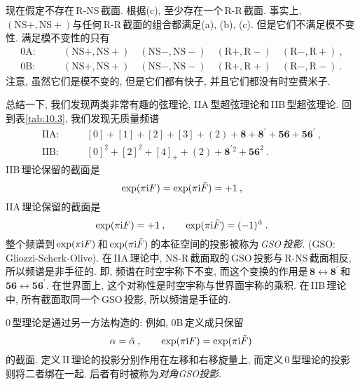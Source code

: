 现在假定不存在\,R-NS\,截面. 根据(c), 至少存在一个\,R-R\,截面. 事实上, $(\text{NS}+,\text{NS}+)$与任何\,R-R\,截面的组合都满足(a), (b), (c). 但是它们不满足模不变性. 满足模不变性的只有
\begin{align*}
     \text{0A}:&\qquad (\text{NS}+,\text{NS}+)\quad (\text{NS}-,\text{NS}-)\quad (\text{R}+,\text{R}-)\quad (\text{R}-,\text{R}+) \:, \\
    \text{0B}:& \qquad (\text{NS}+,\text{NS}+)\quad (\text{NS}-,\text{NS}-)\quad (\text{R}+,\text{R}+)\quad (\text{R}-,\text{R}-) \:.
\end{align*}
注意, 虽然它们是模不变的, 但是它们都有快子, 并且它们都没有时空费米子.

总结一下, 我们发现两类非常有趣的弦理论, IIA\,型超弦理论和\,IIB\,型超弦理论. 回到表\ref{tab:10.3}, 我们发现无质量频谱
\begin{subequations}
    \begin{align}
        \text{IIA:}&\qquad [0]+[1]+[2]+[3]+(2)+\mathbf{8}+\mathbf{8}^{\prime}+\mathbf{56}+\mathbf{56}^{\prime} \:,\label{10.6.8a} \\
        \text{IIB:}&\qquad [0]^{2}+[2]^{2}+[4]_{+}+(2) +\mathbf{8}^{\prime}{}^{2}+\mathbf{56}^{2} \:.\label{10.6.8b} 
    \end{align} \label{10.6.8}
\end{subequations}
IIB\,理论保留的截面是
\begin{equation}
    \exp(\pi\mathrm{i} F) =\exp(\pi\mathrm{i}\tilde{F})=+1 \:,\label{10.6.9}
\end{equation}
IIA\,理论保留的截面是
\begin{equation}
    \exp(\pi\mathrm{i} F) = +1 \:, \qquad \exp(\pi\mathrm{i}\tilde{F})=(-1)^{\tilde{\alpha}} \:.\label{10.6.10}
\end{equation}
整个频谱到$\,\exp(\pi\mathrm{i} F)\,$和$\,\exp(\pi\mathrm{i}\tilde{F})\,$的本征空间的投影被称为\,\emph{GSO}\,{\emph{投影}}. (GSO: Gliozzi-Scherk-Olive). 在\,IIA\,理论中, NS-R\,截面取的\,GSO\,投影与\,R-NS\,截面相反, 所以频谱是非手征的. 即, 频谱在时空宇称下不变, 而这个变换的作用是\,$\mathbf{8}\leftrightarrow\mathbf{8}^{\prime}$\,和\,$\mathbf{56}\leftrightarrow\mathbf{56}^{\prime}$. 在世界面上, 这个对称性是时空宇称与世界面宇称的乘积. 在\,IIB\,理论中, 所有截面取同一个\,GSO\,投影, 所以频谱是手征的.

0\,型理论是通过另一方法构造的: 例如, 0B\,定义成只保留
\begin{equation}
    \alpha=\tilde{\alpha}\:, \qquad \exp(\pi\mathrm{i} F) =\exp(\pi\mathrm{i}\tilde{F})\: \label{10.6.11}
\end{equation}
的截面. 定义\,II\,理论的投影分别作用在左移和右移旋量上, 而定义\,0\,型理论的投影则将二者绑在一起. 后者有时被称为{\emph{对角}}\emph{GSO}{\emph{投影}}.

